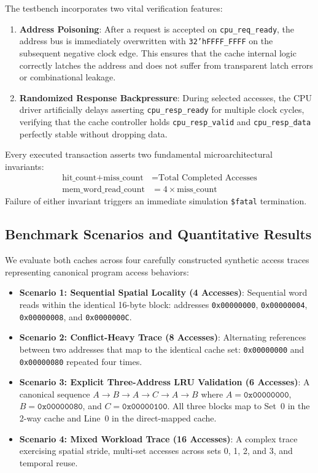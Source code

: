\documentclass[conference]{IEEEtran}
\begin{document}
The testbench incorporates two vital verification features:
\begin{enumerate}
    \item \textbf{Address Poisoning}: After a request is accepted on \texttt{cpu\_req\_ready}, the address bus is immediately overwritten with \texttt{32'hFFFF\_FFFF} on the subsequent negative clock edge. This ensures that the cache internal logic correctly latches the address and does not suffer from transparent latch errors or combinational leakage.
    \item \textbf{Randomized Response Backpressure}: During selected accesses, the CPU driver artificially delays asserting \texttt{cpu\_resp\_ready} for multiple clock cycles, verifying that the cache controller holds \texttt{cpu\_resp\_valid} and \texttt{cpu\_resp\_data} perfectly stable without dropping data.
\end{enumerate}

Every executed transaction asserts two fundamental microarchitectural invariants:
\begin{align}
\text{hit\_count} + \text{miss\_count} &= \text{Total Completed Accesses} \\
\text{mem\_word\_read\_count} &= 4 \times \text{miss\_count}
\end{align}
Failure of either invariant triggers an immediate simulation \texttt{\$fatal} termination.

\subsection{Benchmark Scenarios and Quantitative Results}
We evaluate both caches across four carefully constructed synthetic access traces representing canonical program access behaviors:
\begin{itemize}
    \item \textbf{Scenario 1: Sequential Spatial Locality (4 Accesses)}: Sequential word reads within the identical 16-byte block: addresses \texttt{0x00000000}, \texttt{0x00000004}, \texttt{0x00000008}, and \texttt{0x0000000C}.
    \item \textbf{Scenario 2: Conflict-Heavy Trace (8 Accesses)}: Alternating references between two addresses that map to the identical cache set: \texttt{0x00000000} and \texttt{0x00000080} repeated four times.
    \item \textbf{Scenario 3: Explicit Three-Address LRU Validation (6 Accesses)}: A canonical sequence $A \to B \to A \to C \to A \to B$ where $A = \texttt{0x00000000}$, $B = \texttt{0x00000080}$, and $C = \texttt{0x00000100}$. All three blocks map to Set~0 in the 2-way cache and Line~0 in the direct-mapped cache.
    \item \textbf{Scenario 4: Mixed Workload Trace (16 Accesses)}: A complex trace exercising spatial stride, multi-set accesses across sets 0, 1, 2, and 3, and temporal reuse.
\end{itemize}
\end{document}
